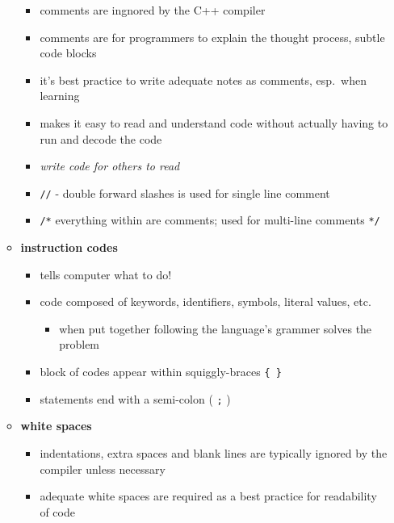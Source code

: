 \documentclass[11pt]{article}
\providecommand{\tightlist}{%
      \setlength{\itemsep}{0pt}\setlength{\parskip}{0pt}}
\begin{document}
\begin{itemize}
\begin{itemize}
    \begin{itemize}
    \tightlist
    \item
      comments are ingnored by the C++ compiler
    \item
      comments are for programmers to explain the thought process,
      subtle code blocks
    \item
      it's best practice to write adequate notes as comments, esp.~when
      learning
    \item
      makes it easy to read and understand code without actually having
      to run and decode the code
    \item
      \emph{write code for others to read}
    \item
      \texttt{//} - double forward slashes is used for single line
      comment
    \item
      \texttt{/*} everything within are comments; used for multi-line
      comments \texttt{*/}
    \end{itemize}
  \item
    \textbf{instruction codes}

    \begin{itemize}
    \tightlist
    \item
      tells computer what to do!
    \item
      code composed of keywords, identifiers, symbols, literal values,
      etc.

      \begin{itemize}
      \tightlist
      \item
        when put together following the language's grammer solves the
        problem
      \end{itemize}
    \item
      block of codes appear within squiggly-braces \texttt{\{\ \}}
    \item
      statements end with a semi-colon ( \texttt{;} )
    \end{itemize}
  \item
    \textbf{white spaces}

    \begin{itemize}
    \tightlist
    \item
      indentations, extra spaces and blank lines are typically ignored
      by the compiler unless necessary
    \item
      adequate white spaces are required as a best practice for
      readability of code
    \end{itemize}
  \end{itemize}
\end{itemize}
\end{document}

